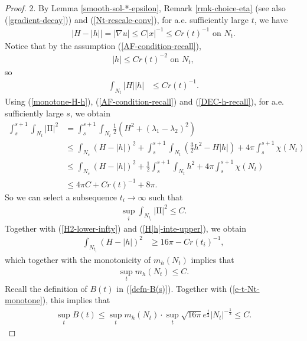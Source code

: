 \documentclass[11pt, letterpaper]{amsart}
\theoremstyle{definition}
\theoremstyle{remark}
\begin{document}
\begin{proof}
2. By Lemma \ref{smooth-sol-*-epsilon}, Remark \ref{rmk-choice-eta} (see also (\ref{gradient-decay})) and (\ref{Nt-rescale-conv}), for a.e. sufficiently large $t$, we have
\begin{align*}
	|H - |h| | = |\nabla u| \leq C |x| ^{-1} \leq C r(t) ^{-1} \text{ on } N_t.
\end{align*} 
Notice that by the assumption (\ref{AF-condition-recall}),
\begin{align}\label{h-3-decay}
	|h| \leq C r(t) ^{-2} \text{ on } N_{t},
\end{align}
so
\begin{align}\label{H|h|-inte-upper}
	\int_{N_t} |H| |h| &\leq C r(t) ^{-1}. 
\end{align} 
Using (\ref{monotone-H-h}), (\ref{AF-condition-recall}) and (\ref{DEC-h-recall}), for a.e. sufficiently large $s$, we obtain
\begin{align*}
	\int_{s}^{s+1} \int_{N_t}|\mathrm{II}|^2 &= \int_{s}^{s+1} \int_{N_t} \frac{1}{2}(H^2+ (\lambda _1 -\lambda _2)^2 )\\
						 &\leq \int_{N_s} (H - |h|)^2 + \int_{s}^{s+1} \int_{N_t}\left( \frac{3}{2} h^2 - H |h| \right)  + 4 \pi \int_{s}^{s+1} \chi (N_t) \\
						 &\leq \int_{N_s} (H - |h|)^2 + \frac{1}{2}\int_{s}^{s+1} \int_{N_t} h^2  + 4 \pi \int_{s}^{s+1} \chi (N_t)\\
						 &\leq 4 \pi C + C r(t) ^{-1} + 8 \pi .
\end{align*} 
So we can select a subsequence $t_i \to \infty$ such that 
\begin{align*}
	\sup_{i} \int_{N_{t_i}}|\mathrm{II}|^2 \leq C.
\end{align*} 
Together with (\ref{H2-lower-infty}) and (\ref{H|h|-inte-upper}), we obtain
\begin{align*}
	\int_{N_{t_i}}(H - |h|)^2 &\geq 16 \pi - C r(t_i) ^{-1},
\end{align*} 
which together with the monotonicity of $m_{h}(N_t)$ implies that
\begin{align*}
	\sup_{t} m_{h}(N_t) \leq C.
\end{align*}
Recall the definition of $B(t)$ in (\ref{defn-B(s)}). Together with (\ref{e-t-Nt-monotone}), this implies that
\begin{align*}
	\sup_{t} B(t) \leq \sup_{t} m_{h}(N_t) \cdot \sup_{t} \sqrt{16 \pi } e ^{\frac{t}{2}} |N_{t}| ^{-\frac{1}{2}} \leq C.
\end{align*} 


\end{proof}
\end{document}
